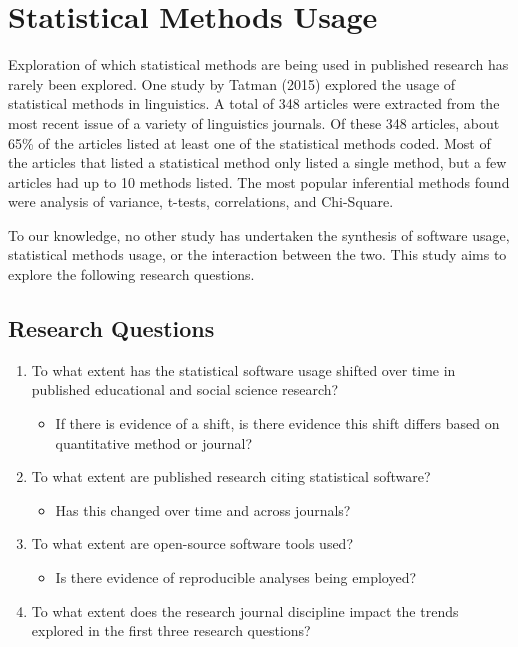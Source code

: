 \documentclass[
  english,
  ,man]{apa6}
\providecommand{\tightlist}{%
  \setlength{\itemsep}{0pt}\setlength{\parskip}{0pt}}
\begin{document}
\hypertarget{statistical-methods-usage}{%
\section{Statistical Methods Usage}\label{statistical-methods-usage}}

Exploration of which statistical methods are being used in published research has rarely been explored. One study by Tatman (2015) explored the usage of statistical methods in linguistics. A total of 348 articles were extracted from the most recent issue of a variety of linguistics journals. Of these 348 articles, about 65\% of the articles listed at least one of the statistical methods coded. Most of the articles that listed a statistical method only listed a single method, but a few articles had up to 10 methods listed. The most popular inferential methods found were analysis of variance, t-tests, correlations, and Chi-Square.

To our knowledge, no other study has undertaken the synthesis of software usage, statistical methods usage, or the interaction between the two. This study aims to explore the following research questions.

\hypertarget{research-questions}{%
\subsection{Research Questions}\label{research-questions}}

\begin{enumerate}
\def\labelenumi{\arabic{enumi}.}
\tightlist
\item
  To what extent has the statistical software usage shifted over time in published educational and social science research?

  \begin{itemize}
  \tightlist
  \item
    If there is evidence of a shift, is there evidence this shift differs based on quantitative method or journal?
  \end{itemize}
\item
  To what extent are published research citing statistical software?

  \begin{itemize}
  \tightlist
  \item
    Has this changed over time and across journals?
  \end{itemize}
\item
  To what extent are open-source software tools used?

  \begin{itemize}
  \tightlist
  \item
    Is there evidence of reproducible analyses being employed?
  \end{itemize}
\item
  To what extent does the research journal discipline impact the trends explored in the first three research questions?
\end{enumerate}
\end{document}
